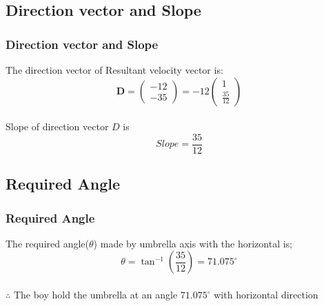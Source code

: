 \documentclass{beamer}
\providecommand{\brak}[1]{\ensuremath{\left(#1\right)}}
\theoremstyle{remark}
\let\vec\mathbf
\numberwithin{equation}{section}
\begin{document}
\subsection{Direction vector and Slope}
\begin{frame}
\frametitle{Direction vector and Slope}
The direction vector of Resultant velocity vector is:
\begin{equation}
    \vec{D}=\begin{pmatrix}
        -12\\
        -35
    \end{pmatrix}
=-12\begin{pmatrix}
    1\\
    \frac{35}{12}
\end{pmatrix}
\end{equation}\\
Slope of direction vector $D$ is\\
\begin{equation}
    Slope=\frac{35}{12}
\end{equation}%
\subsection{Required Angle}
\end{frame}
\begin{frame}[fragile]
\frametitle{Required Angle}

The required angle($\theta$) made by umbrella axis with the horizontal is;\\
\begin{equation}
    \theta=\tan^{-1}\brak{\frac{35}{12}}=71.075^\circ
\end{equation}\\

 $\therefore$ The boy hold the umbrella at an angle $71.075^\circ$ with           horizontal direction \\
\end{frame}
\end{document}
